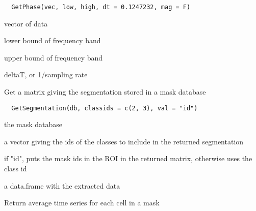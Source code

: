 \documentclass[a4paper]{book}
\begin{document}
%
\begin{Usage}
\begin{verbatim}
  GetPhase(vec, low, high, dt = 0.1247232, mag = F)
\end{verbatim}
\end{Usage}
%
\begin{Arguments}
\begin{ldescription}
\item[\code{vec}] vector of data

\item[\code{low}] lower bound of frequency band

\item[\code{high}] upper bound of frequency band

\item[\code{dt}] deltaT, or 1/sampling rate
\end{ldescription}
\end{Arguments}
%
\begin{Description}\relax
Get a matrix giving the segmentation stored in a mask
database
\end{Description}
%
\begin{Usage}
\begin{verbatim}
  GetSegmentation(db, classids = c(2, 3), val = "id")
\end{verbatim}
\end{Usage}
%
\begin{Arguments}
\begin{ldescription}
\item[\code{db}] the mask database

\item[\code{classids}] a vector giving the ids of the classes to
include in the returned segmentation

\item[\code{val}] if "id", puts the mask ids in the ROI in the
returned matrix, otherwise uses the class id
\end{ldescription}
\end{Arguments}
%
\begin{Value}
a data.frame with the extracted data
\end{Value}
%
\begin{Description}\relax
Return average time series for each cell in a mask
\end{Description}
\end{document}
